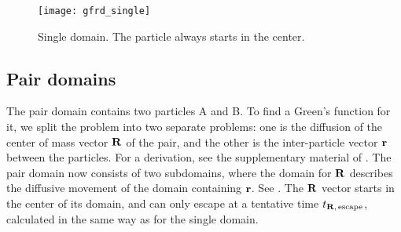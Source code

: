 \begin{figure}[ht]
\centering
\texttt{[image: gfrd\_single]}
\caption{ Single domain. The particle always starts in the center.}
\end{figure}


\subsection{Pair domains}
The pair domain contains two particles A and B. To find a Green's function for it, we split the problem into two separate problems: one is the diffusion of the center of mass vector ${\bf R}$ of the pair, and the other is the inter-particle vector ${\bf r}$ between the particles. For a derivation, see the supplementary material of \cite{Takahashi2010}. The pair domain now consists of two subdomains, where the domain for ${\bf R}$ describes the diffusive movement of the domain containing ${\bf r}$. See . The ${\bf R}$ vector starts in the center of its domain, and can only escape at a tentative time $t_{{\bf R},\,{\rm escape}}$, calculated in the same way as for the single domain. 

